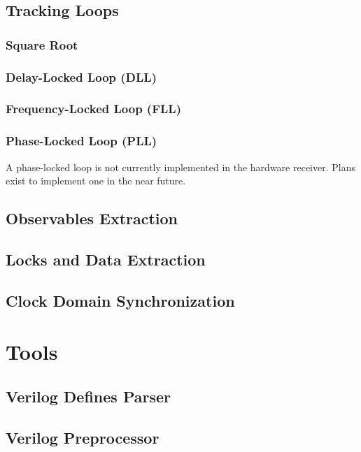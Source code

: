 \documentclass[12pt]{article}
\begin{document}
\subsection{Tracking Loops}

\subsubsection{Square Root}

\subsubsection{Delay-Locked Loop (DLL)}

\subsubsection{Frequency-Locked Loop (FLL)}

\subsubsection{Phase-Locked Loop (PLL)}
A phase-locked loop is not currently implemented in the hardware receiver. Plans exist to implement one in the near future.

\subsection{Observables Extraction}

\subsection{Locks and Data Extraction}

\subsection{Clock Domain Synchronization}

\section{Tools}

\subsection{Verilog Defines Parser}

\subsection{Verilog Preprocessor}
\end{document}

